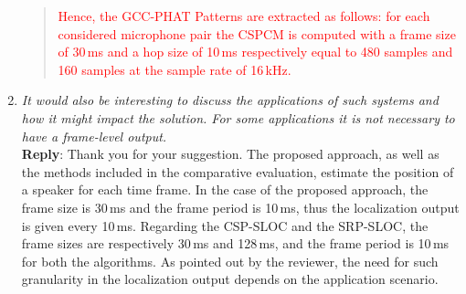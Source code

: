 \documentclass[11pt, technote, letterpaper, oneside, onecolumn]{IEEEtran}
\begin{document}
\begin{enumerate}
\begin{quote}
	\textcolor{red}{Hence, the GCC-PHAT Patterns are extracted as follows: for each considered microphone pair the CSPCM is computed with a frame size of 30\,ms and a hop size of 10\,ms respectively equal to 480 samples and 160 samples at the sample rate of 16\,kHz.}
\end{quote}


\item \textit{It would also be interesting to discuss the applications of such systems and how it might impact the solution. For some applications it is not necessary to have a frame-level output.\\}
\textbf{Reply}: Thank you for your suggestion. The proposed approach, as well as the methods included in the comparative evaluation, estimate the position of a speaker for each time frame. In the case of the proposed approach, the frame size is 30\,ms and the frame period is 10\,ms, thus the localization output is given every 10\,ms. Regarding the CSP-SLOC and the SRP-SLOC, the frame sizes are respectively 30\,ms and 128\,ms, and the frame period is 10\,ms for both the algorithms. As pointed out by the reviewer, the need for such granularity in the localization output depends on the application scenario. %

\end{enumerate}
\end{document}
